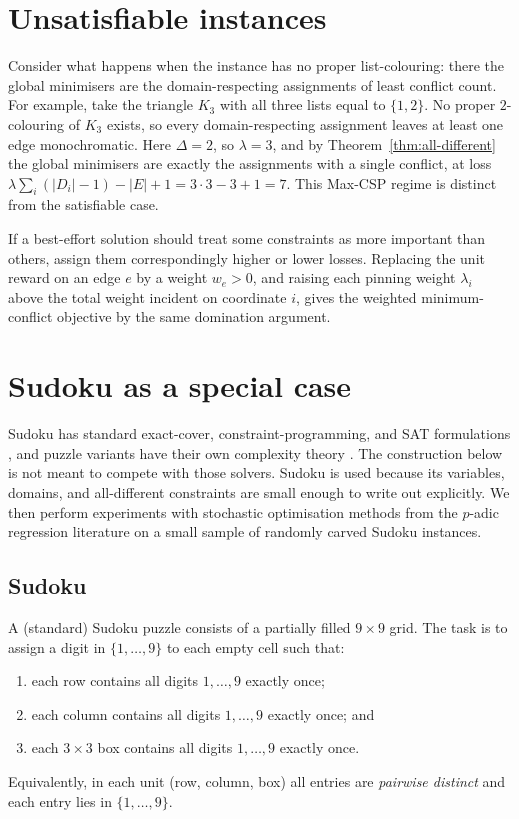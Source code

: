 \documentclass[11pt]{article}
\begin{document}
\section{Unsatisfiable instances}
\label{sec:minimum-conflicts-potts}

Consider what happens when the instance has no proper list-colouring: there the global minimisers are the domain-respecting assignments of least conflict count. For example, take the triangle \(K_3\) with all three lists equal to \(\{1,2\}\). No proper \(2\)-colouring of \(K_3\) exists, so every domain-respecting assignment leaves at least one edge monochromatic. Here \(\Delta=2\), so \(\lambda=3\), and by Theorem~\ref{thm:all-different} the global minimisers are exactly the assignments with a single conflict, at loss \(\lambda\sum_i(|D_i|-1)-|E|+1=3\cdot 3-3+1=7\). This Max-CSP regime is distinct from the satisfiable case.

If a best-effort solution should treat some constraints as more important than others, assign them correspondingly higher or lower losses. Replacing the unit reward on an edge \(e\) by a weight \(w_e>0\), and raising each pinning weight \(\lambda_i\) above the total weight incident on coordinate \(i\), gives the weighted minimum-conflict objective by the same domination argument.

\section{Sudoku as a special case}
\label{sec:sudoku}
Sudoku has standard exact-cover, constraint-programming, and SAT formulations \cite{knuth2000dancing,simonis2005sudoku,lynce2006sudoku}, and puzzle variants have their own complexity theory \cite{yato-seta}. The construction below is not meant to compete with those solvers. Sudoku is used because its variables, domains, and all-different constraints are small enough to write out explicitly. We then perform experiments with stochastic optimisation methods from the \(p\)-adic regression literature on a small sample of randomly carved Sudoku instances.

\subsection{Sudoku}
A (standard) Sudoku puzzle consists of a partially filled $9\times 9$ grid. The task is to assign a digit in $\{1,\dots,9\}$ to each empty cell such that:
\begin{enumerate}
    \item each row contains all digits $1,\dots,9$ exactly once;
    \item each column contains all digits $1,\dots,9$ exactly once; and
    \item each $3\times 3$ box contains all digits $1,\dots,9$ exactly once.
\end{enumerate}
Equivalently, in each unit (row, column, box) all entries are \emph{pairwise distinct} and each entry lies in $\{1,\dots,9\}$.
\end{document}
